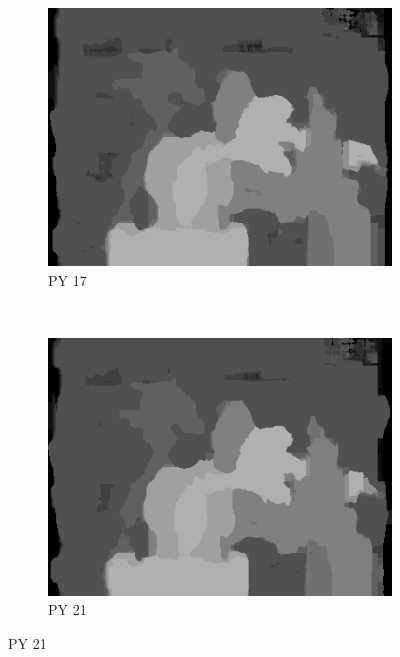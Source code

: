 \begin{figure}
\begin{subfigure}[b]{0.23\textwidth}
    \includegraphics[width=\textwidth]{images/stereo-pairs/tsukuba_pyramid_17.png}
    \caption{PY 17}
  \end{subfigure}
  ~
  \begin{subfigure}[b]{0.23\textwidth}
    \centering
    \includegraphics[width=\textwidth]{images/stereo-pairs/tsukuba_pyramid_21.png}
    \caption{PY 21}
  \end{subfigure}



\end{figure}
